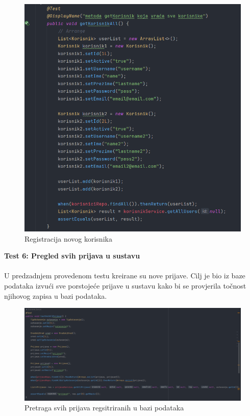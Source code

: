 			\begin{figure}[H]
			\includegraphics[scale=0.5]{slike/allUsers.PNG} %
			\centering
			\caption{Registracija novog korisnika}
			\label{fig:implementacija}
		\end{figure}
		
		\textbf{Test 6: Pregled svih prijava u sustavu}\\
			\\ U predzadnjem provedenom testu kreirane su nove prijave. Cilj je bio iz baze podataka izvući sve porstojeće prijave u sustavu kako bi se provjerila točnost njihovog zapisa u bazi podataka.
			
			\begin{figure}[H]
			\includegraphics[scale=0.5]{slike/svePrijave.PNG} %
			\centering
			\caption{Pretraga svih prijava regsitriranih u bazi podataka}
			\label{fig:implementacija}
		\end{figure}
		
